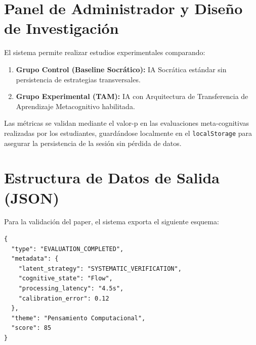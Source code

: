 \documentclass{article}
\begin{document}
\section{Panel de Administrador y Diseño de Investigación}
El sistema permite realizar estudios experimentales comparando:
\begin{enumerate}
    \item \textbf{Grupo Control (Baseline Socrático):} IA Socrática estándar sin persistencia de estrategias transversales.
    \item \textbf{Grupo Experimental (TAM):} IA con Arquitectura de Transferencia de Aprendizaje Metacognitivo habilitada.
\end{enumerate}

Las métricas se validan mediante el valor-p en las evaluaciones meta-cognitivas realizadas por los estudiantes, guardándose localmente en el \texttt{localStorage} para asegurar la persistencia de la sesión sin pérdida de datos.

\section{Estructura de Datos de Salida (JSON)}
Para la validación del paper, el sistema exporta el siguiente esquema:
\begin{verbatim}
{
  "type": "EVALUATION_COMPLETED",
  "metadata": {
    "latent_strategy": "SYSTEMATIC_VERIFICATION",
    "cognitive_state": "Flow",
    "processing_latency": "4.5s",
    "calibration_error": 0.12
  },
  "theme": "Pensamiento Computacional",
  "score": 85
}
\end{verbatim}
\end{document}
